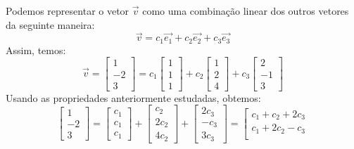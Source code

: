 \begin{resol}
Podemos representar o vetor $\vec{v}$ como uma combinação linear dos outros vetores da seguinte maneira:
\begin{equation}
 \vec{v} = c_1\vec{e_1} + c_2\vec{e_2} + c_3\vec{e_3} 
\end{equation}
Assim, temos:
\begin{equation}
\vec{v} = 
\left[
  \begin{array}{c}
  1 \\
  -2 \\
  3
 \end{array}
\right] =
c_1\left[
 \begin{array}{c}
  1 \\
  1 \\
  1
 \end{array}
\right] +
c_2\left[
 \begin{array}{c}
  1 \\
  2 \\
  4
 \end{array}
\right] +
c_3\left[
  \begin{array}{c}
  2 \\
  -1 \\
  3
 \end{array}
\right]
\end{equation}
Usando as propriedades anteriormente estudadas, obtemos:
\begin{equation}
 \left[
  \begin{array}{c}
  1 \\
  -2 \\
  3
 \end{array}
\right] =
\left[
 \begin{array}{c}
  c_1 \\
  c_1 \\
  c_1
 \end{array}
\right] +
\left[
 \begin{array}{c}
  c_2 \\
  2c_2 \\
  4c_2
 \end{array}
\right] +
\left[
  \begin{array}{c}
  2c_3 \\
  -c_3 \\
  3c_3
 \end{array}
\right] = 
\left[
  \begin{array}{c}
   c_1 + c_2 + 2c_3 \\
   c_1 + 2c_2 - c_3 \\

\end{array}
\end{equation}
\end{resol}
